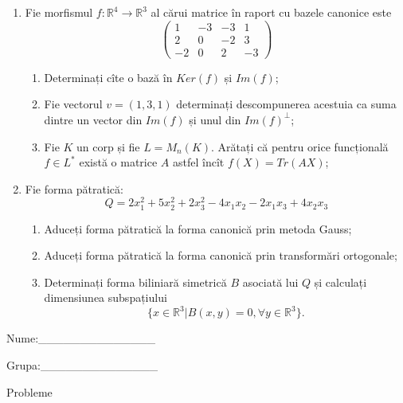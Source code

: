 \documentclass{article}
\begin{document}
\begin{enumerate}
 \item Fie morfismul $f:\mathbb{R}^4 \to \mathbb{R}^3$ al cărui matrice în raport cu bazele canonice este
$$\begin{pmatrix}
1&-3&-3&1\\
2&0&-2&3\\
-2&0&2&-3
\end{pmatrix}$$

\begin{enumerate}
\item Determinați cîte o bază în $Ker(f)$ și $Im(f)$;
\item Fie vectorul $v=(1,3,1)$ determinați descompunerea acestuia ca suma dintre un vector din $Im(f)$ și unul din $Im(f)^\perp$;
\item Fie $K$ un corp și fie $L=M_n(K)$. Arătați că pentru orice funcțională $f \in L^*$ există o matrice $A$ astfel încît $f(X)=Tr(AX)$;
\end{enumerate}
\item Fie forma pătratică:
$$Q= 2x_1^2+5x_2^2+2x_3^2-4x_1x_2-2x_1x_3+4x_2x_3$$

\begin{enumerate}
\item Aduceți forma pătratică la forma canonică prin metoda Gauss;
\item Aduceți forma pătratică la forma canonică prin transformări ortogonale;
\item Determinați forma biliniară simetrică $B$ asociată lui $Q$ și calculați dimensiunea subspațiului
$$\{x \in \mathbb{R}^3 | B(x,y)=0,\forall y \in \mathbb{R}^3\}.$$

\end{enumerate}
\end{enumerate}
\newpage
\begin{flushright}
Nume:\_\_\_\_\_\_\_\_\_\_\_\_\_\_
 
 
Grupa:\_\_\_\_\_\_\_\_\_\_\_\_\_\_
\end{flushright}
\begin{center}
\vspace{2cm}
{\Large Probleme}
\vspace{2cm}
\end{center}
\end{document}
